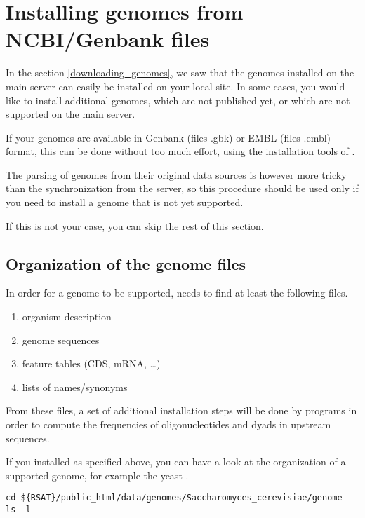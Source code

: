 \section{Installing genomes from  NCBI/Genbank files}

In the section \ref{downloading_genomes}, we saw that the genomes
installed on the main \RSAT server can easily be installed on your
local site. In some cases, you would like to install additional
genomes, which are not published yet, or which are not supported on
the main \RSAT server.

If your genomes are available in Genbank (files .gbk) or EMBL (files
.embl) format, this can be done without too much effort, using the
installation tools of \RSAT. 

The parsing of genomes from their original data sources is however
more tricky than the synchronization from the \RSAT server, so this
procedure should be used only if you need to install a genome that is
not yet supported. 

If this is not your case, you can skip the rest of this section.

\subsection{Organization of the genome files}

In order for a genome to be supported, \RSAT needs to find at least
the following files.

\begin{enumerate}
\item organism description
\item genome sequences
\item feature tables (CDS, mRNA, \ldots)
\item lists of names/synonyms
\end{enumerate}

From these files, a set of additional installation steps will be done
by \RSAT programs in order to compute the frequencies of
oligonucleotides and dyads in upstream sequences.

If you installed \RSAT as specified above, you can have a look at the
organization of a supported genome, for example the yeast
.

\begin{footnotesize}
\begin{verbatim}
cd ${RSAT}/public_html/data/genomes/Saccharomyces_cerevisiae/genome
ls -l
\end{verbatim}
\end{footnotesize}

